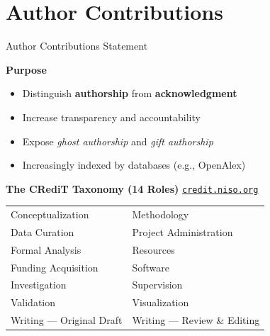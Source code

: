 \documentclass{beamer}
\begin{document}
\section{Author Contributions}

\begin{frame}{Author Contributions Statement}

  \textbf{Purpose}
  \smallskip
  \begin{itemize}
    \item Distinguish \textbf{authorship} from \textbf{acknowledgment}
    \item Increase transparency and accountability
    \item Expose \emph{ghost authorship} and \emph{gift authorship}
    \item Increasingly indexed by databases (e.g., OpenAlex)
  \end{itemize}

  \medskip
  \textbf{The CRediT Taxonomy (14 Roles)} \href{https://credit.niso.org}{\texttt{credit.niso.org}}
  \begin{center}
  {\footnotesize
  \begin{tabular}{@{}ll@{}}
    \hline
    Conceptualization     & Methodology \\
    Data Curation         & Project Administration \\
    Formal Analysis       & Resources \\
    Funding Acquisition   & Software \\
    Investigation         & Supervision \\
    Validation            & Visualization \\
    Writing --- Original Draft & Writing --- Review \& Editing \\
    \hline
  \end{tabular}
  }
\end{center}

\end{frame}
\end{document}
